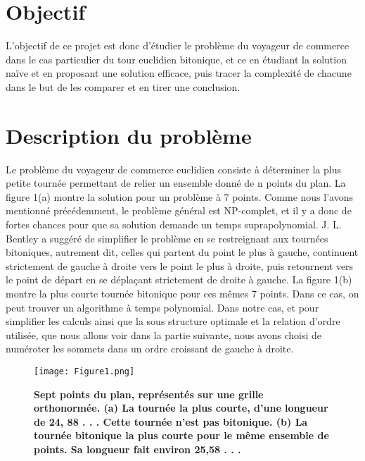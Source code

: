 \documentclass[12pt, openany]{report}
\begin{document}
\setlength{\parindent}{1cm}\section{Objectif}
L'objectif de ce projet est donc d'étudier le problème du voyageur de commerce dans le cas particulier du tour euclidien bitonique, et ce en étudiant la solution naïve et en proposant une solution efficace, puis tracer la complexité de chacune dans le but de les comparer et en tirer une conclusion.
\setlength{\parindent}{1cm}\section{Description du problème}
Le problème du voyageur de commerce euclidien consiste à déterminer la plus petite
tournée permettant de relier un ensemble donné de n points du plan. La figure 1(a)
montre la solution pour un problème à 7 points. Comme nous l'avons mentionné précédemment, le problème général est NP-complet, et il y a donc de fortes chances pour que sa solution demande un temps suprapolynomial. 
J. L. Bentley a suggéré de simplifier le problème en se restreignant aux tournées
bitoniques, autrement dit, celles qui partent du point le plus à gauche, continuent
strictement de gauche à droite vers le point le plus à droite, puis retournent vers
le point de départ en se déplaçant strictement de droite à gauche. La figure 1(b)
montre la plus courte tournée bitonique pour ces mêmes 7 points. Dans ce cas, on
peut trouver un algorithme à temps polynomial.
Dans notre cas, et pour simplifier les calculs ainsi que la sous structure optimale et la relation d'ordre utilisée, que nous allons voir dans la partie suivante, nous avons choisi de numéroter les sommets dans un ordre croissant de gauche à droite. 
\begin{center}
	\begin{figure}[h]
		\begin{center}
			\texttt{[image: Figure1.png]} 
		\end{center}
		\caption{\textbf{Sept points du plan, représentés sur une grille orthonormée. (a) La tournée la plus
				courte, d’une longueur de 24, 88 . . . Cette tournée n’est pas bitonique. (b) La tournée bitonique
				la plus courte pour le même ensemble de points. Sa longueur fait environ 25,58 . . .}}
		\label{Sept points du plan, représentés sur une grille orthonormée. (a) La tournée la plus
			courte, d’une longueur de 24, 88 . . . Cette tournée n’est pas bitonique. (b) La tournée bitonique
			la plus courte pour le même ensemble de points. Sa longueur fait environ 25,58 . . .}
	\end{figure} 
\end{center} 
\end{document}
